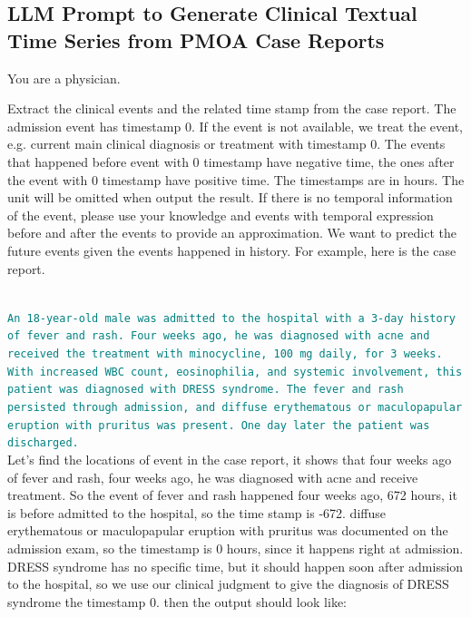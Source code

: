 \subsection{LLM Prompt to Generate Clinical Textual Time Series from PMOA Case Reports}\label{ch07:TTS_prompt}




\begin{tcolorbox}[breakable,colback=gray!5, colframe=gray!100, title=Prompt, boxrule=2pt]

{You are a physician. 

Extract the clinical events and the related time stamp from the case report. The admission event has timestamp 0. If the event is not available, we treat the event, e.g. current main clinical diagnosis or treatment with timestamp 0. The events that happened before event with 0 timestamp have negative time, the ones after the event with 0 timestamp have positive time. The timestamps are in hours. The unit will be omitted when output the result. If there is no temporal information of the event, please use your knowledge and events with temporal expression before and after the events to provide an approximation. We want to predict the future events given the events happened in history. For example, here is the case report.}\\

\noindent
\textcolor{teal}{\texttt{An 18-year-old male was admitted to the hospital with a 3-day history of fever and rash. Four weeks ago, he was diagnosed with acne and received the treatment with minocycline, 100 mg daily, for 3 weeks. With increased WBC count, eosinophilia, and systemic involvement, this patient was diagnosed with DRESS syndrome. The fever and rash persisted through admission, and diffuse erythematous or maculopapular eruption with pruritus was present. One day later the patient was discharged.}}\\

\noindent
{Let's find the locations of event in the case report, it shows that four weeks ago of fever and rash, four weeks ago, he was diagnosed with acne and receive treatment. So the event of fever and rash happened four weeks ago, 672 hours, it is before admitted to the hospital, so the time stamp is -672. diffuse erythematous or maculopapular eruption with pruritus was documented on the admission exam, so the timestamp is 0 hours, since it happens right at admission. DRESS syndrome has no specific time, but it should happen soon after admission to the hospital, so we use our clinical judgment to give the diagnosis of DRESS syndrome the timestamp 0. then the output should look like:}\\


\end{tcolorbox}
